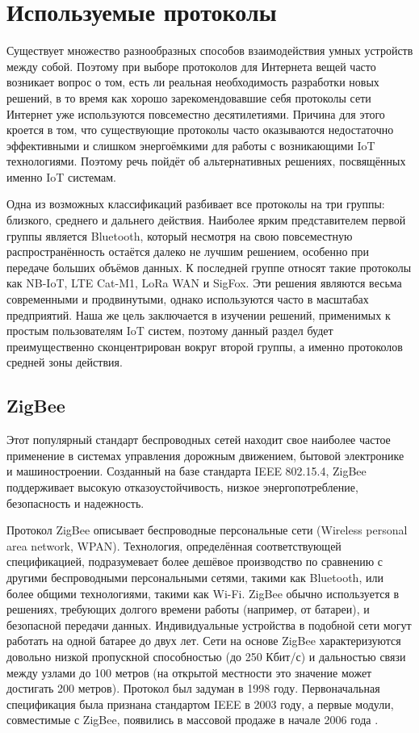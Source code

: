 	
	\section{Используемые протоколы}
	
	Существует множество разнообразных способов взаимодействия умных устройств между собой. Поэтому
	при выборе протоколов для Интернета вещей часто возникает вопрос о том, есть ли реальная необходимость
	разработки новых решений, в то время как хорошо зарекомендовавшие себя протоколы сети Интернет уже
	используются повсеместно десятилетиями. Причина для этого кроется в том, что существующие протоколы
	часто оказываются недостаточно эффективными и слишком энергоёмкими для работы с возникающими
	IoT технологиями. Поэтому речь пойдёт об альтернативных решениях, посвящённых именно IoT системам.
	
	Одна из возможных классификаций разбивает все протоколы на три группы: близкого, среднего и дальнего
	действия. Наиболее ярким представителем первой группы является Bluetooth, который несмотря на свою
	повсеместную распространённость остаётся далеко не лучшим решением, особенно при передаче больших
	объёмов данных. К последней группе относят такие протоколы как NB-IoT, LTE Cat-M1, LoRa WAN и SigFox.
	Эти решения являются весьма современными и продвинутыми, однако используются часто в масштабах
	предприятий. Наша же цель заключается в изучении решений, применимых к простым пользователям 
	IoT систем, поэтому данный раздел будет преимущественно сконцентрирован вокруг второй группы, 
	а именно протоколов средней зоны действия.
	
	
	

	\subsection{ZigBee}
	Этот популярный стандарт беспроводных сетей находит свое наиболее частое применение в системах 
	управления дорожным движением, бытовой электронике и машиностроении. Созданный на базе стандарта
	IEEE 802.15.4, ZigBee поддерживает высокую отказоустойчивость, низкое энергопотребление, безопасность
	и надежность.
	
	Протокол ZigBee описывает беспроводные персональные сети (Wireless personal area network, WPAN).
	Технология, определённая соответствующей спецификацией, подразумевает более дешёвое производство по
	сравнению с другими беспроводными персональными сетями, такими как Bluetooth, или более общими
	технологиями, такими как Wi-Fi. ZigBee обычно используется в решениях, требующих долгого времени
	работы (например, от батареи), и безопасной передачи данных.
	Индивидуальные устройства в подобной сети могут работать на одной батарее до двух лет.
	Сети на основе ZigBee характеризуются довольно низкой пропускной способностью (до 250 Кбит/с) и
	дальностью связи между узлами до 100 метров (на открытой местности это значение может достигать
	200 метров). Протокол был задуман в 1998 году. Первоначальная спецификация была признана стандартом 
	IEEE в 2003 году, а первые модули, совместимые с ZigBee, появились в массовой продаже в начале 2006 года
	 \cite{zigbee-certified-products}.
	
